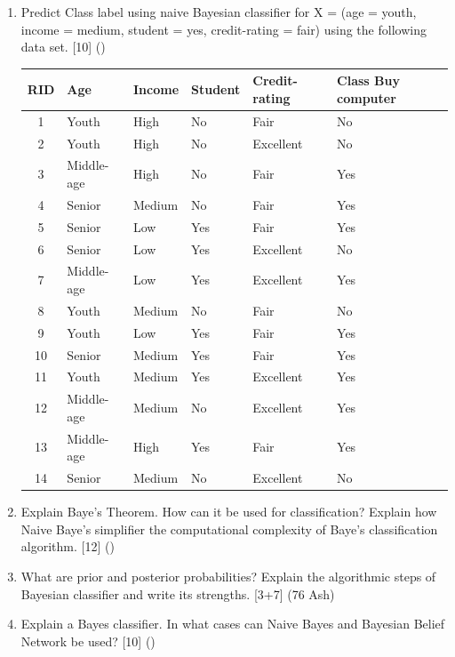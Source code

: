 \documentclass[12pt]{article}
\begin{document}
\begin{enumerate}[topsep=0pt, noitemsep]
      \item Predict Class label using naive Bayesian classifier for X = (age = youth, income = medium, student = yes, credit-rating = fair) using the following data set. \hfill [10] ()\\
        \small
        \begin{tabular}{|c|l|l|l|l|l|}
          \hline
          RID & Age & Income & Student & Credit-rating & Class Buy computer \\ \hline
          1 & Youth & High & No & Fair & No \\ \hline
          2 & Youth & High & No & Excellent & No \\ \hline
          3 & Middle-age & High & No & Fair & Yes \\ \hline
          4 & Senior & Medium & No & Fair & Yes \\ \hline
          5 & Senior & Low & Yes & Fair & Yes \\ \hline
          6 & Senior & Low & Yes & Excellent & No \\ \hline
          7 & Middle-age & Low & Yes & Excellent & Yes \\ \hline
          8 & Youth & Medium & No & Fair & No \\ \hline
          9 & Youth & Low & Yes & Fair & Yes \\ \hline
          10 & Senior & Medium & Yes & Fair & Yes \\ \hline
          11 & Youth & Medium & Yes & Excellent & Yes \\ \hline
          12 & Middle-age & Medium & No & Excellent & Yes \\ \hline
          13 & Middle-age & High & Yes & Fair & Yes \\ \hline
          14 & Senior & Medium & No & Excellent & No \\ \hline
        \end{tabular}
        \normalsize

      \item Explain Baye's Theorem. How can it be used for classification? Explain how Naive Baye's simplifier the computational complexity of Baye's classification algorithm. \hfill [12] ()

      \item What are prior and posterior probabilities? Explain the algorithmic steps of Bayesian classifier and write its strengths. \hfill [3+7] (76 Ash)

      \item Explain a Bayes classifier. In what cases can Naive Bayes and Bayesian Belief Network be used? \hfill [10] ()


\end{enumerate}
\end{document}
